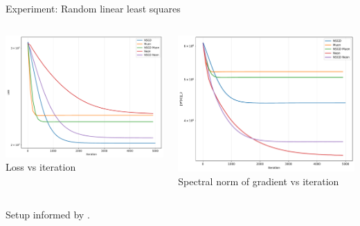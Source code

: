 \documentclass[aspectratio=169]{beamer}
\begin{document}
\begin{frame}{Experiment: Random linear least squares}
  \begin{columns}[T,totalwidth=\textwidth]
    \begin{column}{0.48\textwidth}
      \includegraphics[width=\linewidth]{simple_lls/loss_vs_iteration_50x50.pdf}
      \centering
      \scriptsize Loss vs iteration
    \end{column}
    \begin{column}{0.48\textwidth}
      \includegraphics[width=\linewidth]{simple_lls/gradient_spectral_norm_vs_iteration_50x50.pdf}
      \centering
      \scriptsize Spectral norm of gradient vs iteration
    \end{column}
  \end{columns}
  \vspace{0.3em}
  \footnotesize Setup informed by \citet{kovalev2025understanding}.
\end{frame}
\end{document}
